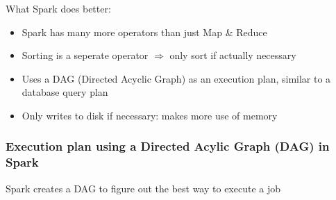 \documentclass{article}
\begin{document}
What Spark does better:

\begin{itemize}
    \item Spark has many more operators than just Map \& Reduce
    \item Sorting is a seperate operator $\Rightarrow$ only sort if actually necessary
    \item Uses a DAG (Directed Acyclic Graph) as an execution plan, similar to a database query plan
    \item Only writes to disk if necessary: makes more use of memory
\end{itemize}

\subsubsection{Execution plan using a Directed Acylic Graph (DAG) in Spark}

Spark creates a DAG to figure out the best way to execute a job
\end{document}
